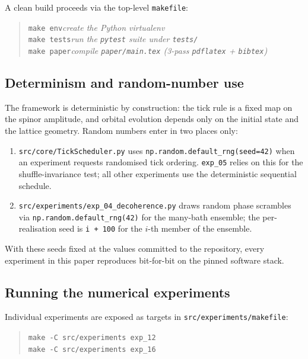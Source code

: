 A clean build proceeds via the top-level \texttt{makefile}:

\begin{quote}
\texttt{make env}\hfill\textit{create the Python virtualenv}\\
\texttt{make tests}\hfill\textit{run the \texttt{pytest} suite under
\texttt{tests/}}\\
\texttt{make paper}\hfill\textit{compile \texttt{paper/main.tex} (3-pass
\texttt{pdflatex} + \texttt{bibtex})}
\end{quote}

\subsection*{Determinism and random-number use}

The framework is deterministic by construction: the tick rule is a
fixed map on the spinor amplitude, and orbital evolution depends
only on the initial state and the lattice geometry.
Random numbers enter in two places only:

\begin{enumerate}
\item \nolinkurl{src/core/TickScheduler.py} uses
\nolinkurl{np.random.default_rng(seed=42)} when an experiment requests
randomised tick ordering. \texttt{exp\_05} relies on this for the
shuffle-invariance test; all other experiments use the deterministic
sequential schedule.

\item \nolinkurl{src/experiments/exp_04_decoherence.py} draws
random phase scrambles via \nolinkurl{np.random.default_rng(42)}
for the many-bath ensemble; the per-realisation seed is
\texttt{i + 100} for the $i$-th member of the ensemble.
\end{enumerate}

With these seeds fixed at the values committed to the repository,
every experiment in this paper reproduces bit-for-bit on the pinned
software stack.

\subsection*{Running the numerical experiments}

Individual experiments are exposed as targets in
\nolinkurl{src/experiments/makefile}:

\begin{quote}
\texttt{make -C src/experiments exp\_12}\\
\texttt{make -C src/experiments exp\_16}
\end{quote}

